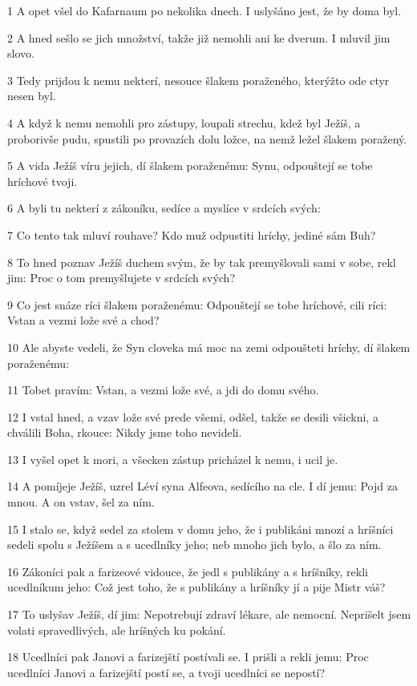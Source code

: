 \par 1 A opet všel do Kafarnaum po nekolika dnech. I uslyšáno jest, že by doma byl.
\par 2 A hned sešlo se jich množství, takže již nemohli ani ke dverum. I mluvil jim slovo.
\par 3 Tedy prijdou k nemu nekterí, nesouce šlakem poraženého, kterýžto ode ctyr nesen byl.
\par 4 A když k nemu nemohli pro zástupy, loupali strechu, kdež byl Ježíš, a proborivše pudu, spustili po provazích dolu ložce, na nemž ležel šlakem poražený.
\par 5 A vida Ježíš víru jejich, dí šlakem poraženému: Synu, odpouštejí se tobe hríchové tvoji.
\par 6 A byli tu nekterí z zákoníku, sedíce a myslíce v srdcích svých:
\par 7 Co tento tak mluví rouhave? Kdo muž odpustiti hríchy, jediné sám Buh?
\par 8 To hned poznav Ježíš duchem svým, že by tak premyšlovali sami v sobe, rekl jim: Proc o tom premyšlujete v srdcích svých?
\par 9 Co jest snáze ríci šlakem poraženému: Odpouštejí se tobe hríchové, cili ríci: Vstan a vezmi lože své a chod?
\par 10 Ale abyste vedeli, že Syn cloveka má moc na zemi odpoušteti hríchy, dí šlakem poraženému:
\par 11 Tobet pravím: Vstan, a vezmi lože své, a jdi do domu svého.
\par 12 I vstal hned, a vzav lože své prede všemi, odšel, takže se desili všickni, a chválili Boha, rkouce: Nikdy jsme toho nevideli.
\par 13 I vyšel opet k mori, a všecken zástup pricházel k nemu, i ucil je.
\par 14 A pomíjeje Ježíš, uzrel Léví syna Alfeova, sedícího na cle. I dí jemu: Pojd za mnou. A on vstav, šel za ním.
\par 15 I stalo se, když sedel za stolem v domu jeho, že i publikáni mnozí a hríšníci sedeli spolu s Ježíšem a s ucedlníky jeho; neb mnoho jich bylo, a šlo za ním.
\par 16 Zákoníci pak a farizeové vidouce, že jedl s publikány a s hríšníky, rekli ucedlníkum jeho: Což jest toho, že s publikány a hríšníky jí a pije Mistr váš?
\par 17 To uslyšav Ježíš, dí jim: Nepotrebují zdraví lékare, ale nemocní. Neprišelt jsem volati spravedlivých, ale hríšných ku pokání.
\par 18 Ucedlníci pak Janovi a farizejští postívali se. I prišli a rekli jemu: Proc ucedlníci Janovi a farizejští postí se, a tvoji ucedlníci se nepostí?
